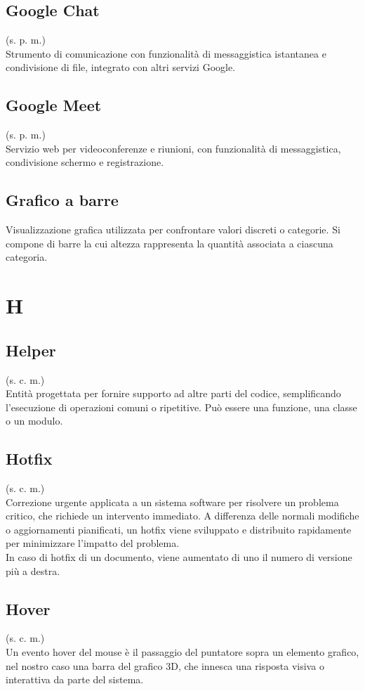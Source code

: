     \subsection{Google Chat}
    (s. p. m.)\\
    Strumento di comunicazione con funzionalità di messaggistica
    istantanea e condivisione di file, integrato con altri servizi Google.
    \subsection{Google Meet}    
    (s. p. m.)\\
    Servizio web per videoconferenze e riunioni, con funzionalità di messaggistica,
    condivisione schermo e registrazione.
    \subsection{Grafico a barre}
    Visualizzazione grafica utilizzata per confrontare valori discreti o categorie. 
    Si compone di barre la cui altezza rappresenta la quantità associata a ciascuna categoria.
\pagebreak
\section{H}
    \subsection{Helper}
    (s. c. m.)\\
    Entità progettata per fornire supporto ad altre parti del codice, 
    semplificando l'esecuzione di operazioni comuni o ripetitive.
    Può essere una funzione, una classe o un modulo.
    \subsection{Hotfix}
    (s. c. m.)\\
    Correzione urgente applicata a un sistema software per risolvere un problema critico, 
    che richiede un intervento immediato. A differenza delle normali modifiche o aggiornamenti pianificati, 
    un hotfix viene sviluppato e distribuito rapidamente per minimizzare l'impatto del problema.\\
    In caso di hotfix di un documento, viene aumentato di uno il numero di versione più a destra.
    \subsection{Hover}
    (s. c. m.)\\
    Un evento hover del mouse è il passaggio del puntatore sopra un elemento grafico, nel nostro caso una barra del grafico 3D, che innesca una risposta visiva o interattiva da parte del sistema.
\pagebreak
